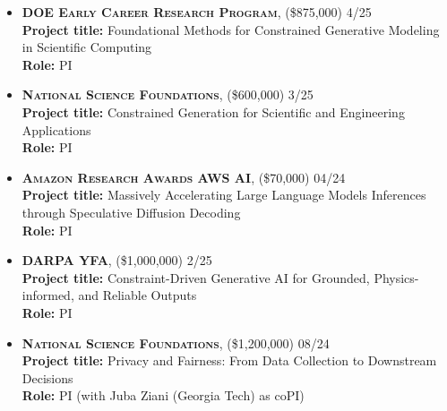 



\begin{itemize}
	\item \textbf{\textsc{DOE Early Career Research Program}}, 
	(\$875,000)  \hfill \textsc{4/25}\\
	{\bf Project title:} {Foundational Methods for Constrained Generative Modeling in Scientific Computing}\\
	{\bf Role:} PI


	\item \textbf{\textsc{National Science Foundations}}, 
	(\$600,000)  \hfill \textsc{3/25}\\
	{\bf Project title:} {Constrained Generation for Scientific and Engineering Applications}\\
	{\bf Role:} PI

	\item \textbf{\textsc{Amazon Research Awards AWS AI}}, 
	(\$70,000) \hfill \textsc{04/24}\\
	{\bf Project title:} {Massively Accelerating Large Language Models Inferences through Speculative Diffusion Decoding}\\
	{\bf Role:} PI

	\item \textbf{\textsc{DARPA YFA}}, 
	(\$1,000,000)  \hfill \textsc{2/25}\\
	{\bf Project title:} {Constraint-Driven Generative AI for Grounded, Physics-informed, and Reliable Outputs}\\
	{\bf Role:} PI

	\item \textbf{\textsc{National Science Foundations}}, 
	(\$1,200,000) \hfill \textsc{08/24}\\
	{\bf Project title:} {Privacy and Fairness: From Data Collection to Downstream Decisions}\\
	{\bf Role:} PI (with Juba Ziani (Georgia Tech) as coPI)



\end{itemize}
